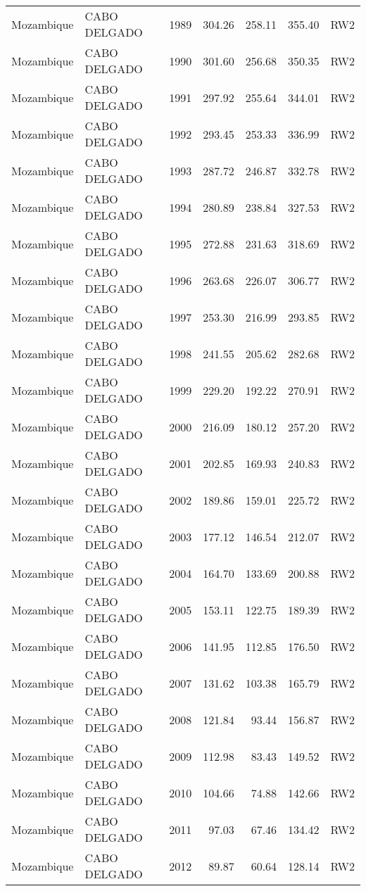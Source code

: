 \begin{longtable}{lllrrrl}
  Mozambique & CABO DELGADO & 1989 & 304.26 & 258.11 & 355.40 & RW2 \\ 
  Mozambique & CABO DELGADO & 1990 & 301.60 & 256.68 & 350.35 & RW2 \\ 
  Mozambique & CABO DELGADO & 1991 & 297.92 & 255.64 & 344.01 & RW2 \\ 
  Mozambique & CABO DELGADO & 1992 & 293.45 & 253.33 & 336.99 & RW2 \\ 
  Mozambique & CABO DELGADO & 1993 & 287.72 & 246.87 & 332.78 & RW2 \\ 
  Mozambique & CABO DELGADO & 1994 & 280.89 & 238.84 & 327.53 & RW2 \\ 
  Mozambique & CABO DELGADO & 1995 & 272.88 & 231.63 & 318.69 & RW2 \\ 
  Mozambique & CABO DELGADO & 1996 & 263.68 & 226.07 & 306.77 & RW2 \\ 
  Mozambique & CABO DELGADO & 1997 & 253.30 & 216.99 & 293.85 & RW2 \\ 
  Mozambique & CABO DELGADO & 1998 & 241.55 & 205.62 & 282.68 & RW2 \\ 
  Mozambique & CABO DELGADO & 1999 & 229.20 & 192.22 & 270.91 & RW2 \\ 
  Mozambique & CABO DELGADO & 2000 & 216.09 & 180.12 & 257.20 & RW2 \\ 
  Mozambique & CABO DELGADO & 2001 & 202.85 & 169.93 & 240.83 & RW2 \\ 
  Mozambique & CABO DELGADO & 2002 & 189.86 & 159.01 & 225.72 & RW2 \\ 
  Mozambique & CABO DELGADO & 2003 & 177.12 & 146.54 & 212.07 & RW2 \\ 
  Mozambique & CABO DELGADO & 2004 & 164.70 & 133.69 & 200.88 & RW2 \\ 
  Mozambique & CABO DELGADO & 2005 & 153.11 & 122.75 & 189.39 & RW2 \\ 
  Mozambique & CABO DELGADO & 2006 & 141.95 & 112.85 & 176.50 & RW2 \\ 
  Mozambique & CABO DELGADO & 2007 & 131.62 & 103.38 & 165.79 & RW2 \\ 
  Mozambique & CABO DELGADO & 2008 & 121.84 & 93.44 & 156.87 & RW2 \\ 
  Mozambique & CABO DELGADO & 2009 & 112.98 & 83.43 & 149.52 & RW2 \\ 
  Mozambique & CABO DELGADO & 2010 & 104.66 & 74.88 & 142.66 & RW2 \\ 
  Mozambique & CABO DELGADO & 2011 & 97.03 & 67.46 & 134.42 & RW2 \\ 
  Mozambique & CABO DELGADO & 2012 & 89.87 & 60.64 & 128.14 & RW2 \\ 

\end{longtable}
